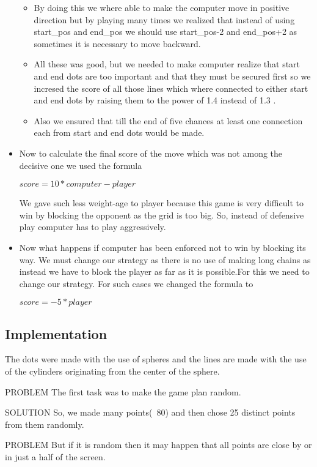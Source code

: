 \documentclass[11pt]{article}
\begin{document}
\begin{itemize}
\begin{itemize}
\item By doing this we where able to make the computer move in positive direction but by playing many times we realized that instead of using start\_pos and end\_pos we should use start\_pos-2 and end\_pos+2  as sometimes it is necessary to move backward.
\item All these was good, but we needed to make computer realize that start and end dots are too important and that they must be secured first so we incresed the score of all those lines which where connected to either start and end dots by raising them to the power of 1.4 instead of 1.3 .
\item Also we ensured that till the end of five chances at least one connection each from start and end dots would be made.
\end{itemize}
\item Now to calculate the final score of the move which was not among the decisive one we used the formula 
\begin{center}
$score=10*computer - player$
\end{center}
We gave such less weight-age to player because this game is very difficult to win by blocking the opponent as the grid is too big. So, instead of defensive play computer has to play aggressively.
\item Now what happens if computer has been enforced not to win by blocking its way. We must change our strategy as there is no use of making long chains as instead we have to block the player as far as it is possible.For this we need to change our strategy.
For such cases we changed the formula to 
\begin{center}
$score= - 5 * player$  
\end{center}
\end{itemize}

\subsection{Implementation}
The dots were made with the use of spheres and the lines are made with the use of the cylinders originating from the center of the sphere.

{\color{red}PROBLEM }The first task was to make the game plan random.

{\color{green}SOLUTION }So, we made many points(~80) and then chose 25 distinct points from them randomly.

{\color{red}PROBLEM }But if it is random then it may happen that all points are close by or in just a half of the screen.
\end{document}
